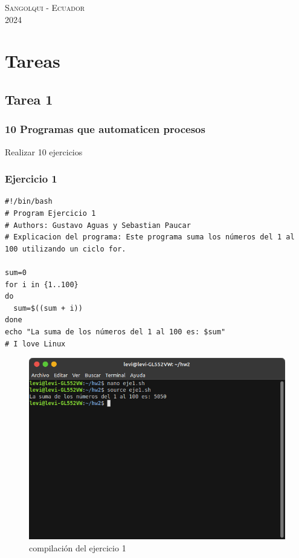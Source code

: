 \documentclass[11pt,twoside]{book}
\begin{document}
  \begin{center} \Large \textsc{Sangolqui - Ecuador} \\
  \vspace{0.5cm}
    \Large \textsc{2024 } \end{center}
  
  \let\cleardoublepage\clearpage
  \chapter{Tareas}

\section{Tarea 1}
\subsection{10 Programas que automaticen procesos}
Realizar 10 ejercicios
\subsection{Ejercicio 1}
\begin{lstlisting}
#!/bin/bash
# Program Ejercicio 1
# Authors: Gustavo Aguas y Sebastian Paucar
# Explicacion del programa: Este programa suma los números del 1 al 100 utilizando un ciclo for.

sum=0
for i in {1..100}
do
  sum=$((sum + i))
done
echo "La suma de los números del 1 al 100 es: $sum"
# I love Linux
\end{lstlisting}
\begin{figure}[h]
    \centering
    \includegraphics[width=0.8\linewidth]{Tarea2/teje1.png}
    \caption{ compilación del ejercicio 1}
\end{figure}
\end{document}
